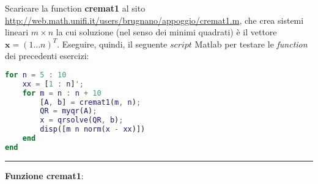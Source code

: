 Scaricare la function \textbf{cremat1} al sito
\url{http://web.math.unifi.it/users/brugnano/appoggio/cremat1.m},
che crea sistemi lineari $m \times n$ la cui soluzione (nel senso dei minimi quadrati) è il vettore $\textbf{x}=(1 \dots n)^{T}$.
Eseguire, quindi, il seguente $script$ Matlab per testare le \textit{function} dei precedenti esercizi:
\begin{lstlisting}[language=Matlab]
for n = 5 : 10
	xx = [1 : n]';
	for m = n : n + 10
		[A, b] = cremat1(m, n);
		QR = myqr(A);
		x = qrsolve(QR, b);
		disp([m n norm(x - xx)])
	end
end
\end{lstlisting}

\hspace*{\fill}
\par\noindent\rule{\textwidth}{0.4pt}
\hspace*{\fill}

\textbf{Funzione cremat1}:

